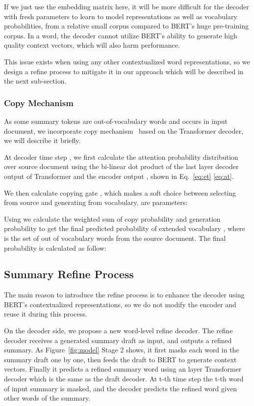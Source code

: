 \documentclass{article}
\begin{document}
If we just use the embedding matrix here, 
it will be more difficult for the decoder with fresh parameters to learn to model representations as well as vocabulary probabilities, from a relative small corpus compared to BERT's huge pre-training corpus. In a word, the decoder cannot utilize BERT's ability to generate high quality context vectors, which will also harm performance.

This issue exists when using any other contextualized word representations, so we design a refine process to mitigate it in our approach which will be described in the next sub-section.

\subsubsection{Copy Mechanism}

As some summary tokens are out-of-vocabulary words and occurs in input document, we incorporate copy mechanism~\cite{Gu2015} based on the Transformer decoder, we will describe it briefly.

At decoder time step , we first calculate the attention probability distribution over source document  using the bi-linear dot product of the last layer decoder output of Transformer  and the encoder output , shown in Eq.~\eqref{eq:et} \eqref{eq:at}. 



We then calculate copying gate , which makes a soft choice between selecting from source and generating from vocabulary,  are parameters: 



Using  we calculate the weighted sum of copy probability and generation probability to get the final predicted probability of extended vocabulary , where  is the set of out of vocabulary words from the source document. The final probability is calculated as follow:



\subsection{Summary Refine Process}

The main reason to introduce the refine process is to enhance the decoder using BERT's contextualized representations, so we do not modify the encoder and reuse it during this process.

On the decoder side, we propose a new word-level refine decoder. The refine decoder receives a generated summary draft as input, and outputs a refined summary. As Figure~\ref{fig:model} Stage 2 shows, it first masks each word in the summary draft one by one, then feeds the draft to BERT to generate context vectors. Finally it predicts a refined summary word using an  layer Transformer decoder which is the same as the draft decoder. At t-th time step the t-th word of input summary is masked, and the decoder predicts the refined word given other words of the summary.
\end{document}
